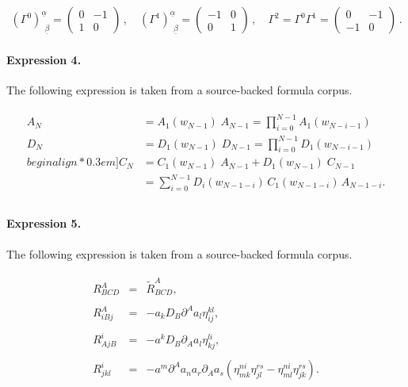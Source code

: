 \documentclass[11pt]{article}
\begin{document}
\begin{align*}(\Gamma^{0})^{\underline\alpha}_{~~\underline\beta}= \left(\begin{array}{cc}0 & -1\\1 & 0\end{array}\right)\,, \quad(\Gamma^{1})^{\underline\alpha}_{~~\underline\beta}= \left(\begin{array}{cc}-1 & 0\\0 & 1\end{array}\right)\, , \quad \Gamma^2=\Gamma^0\Gamma^1=\left(\begin{array}{cc}0 & -1\\-1 & 0\end{array}\right) \,.\end{align*}

\paragraph{Expression 4.} The following expression is taken from a source-backed formula corpus.

\begin{align*} \begin{aligned}A_N &= A_1(w_{N-1})\;\! A_{N-1} = \prod_{i=0}^{N-1} A_1(w_{N-i-1}) \\D_N &= D_1(w_{N-1})\;\! D_{N-1} = \prod_{i=0}^{N-1} D_1(w_{N-i-1}) \\begin{align*}0.3em]C_N &= C_1(w_{N-1})\;\! A_{N-1} + D_1(w_{N-1})\;\! C_{N-1} \\&= \sum_{i=0}^{N-1} D_i(w_{N-1-i})\, C_1(w_{N-1-i}) \, A_{N-1-i} . \\\end{aligned} \end{align*}

\paragraph{Expression 5.} The following expression is taken from a source-backed formula corpus.

\begin{align*}\begin{array}{ccc}R_{BCD}^A & = & \tilde{R}_{BCD}^A, \\ & & \\ R_{iBj}^A & = & -a_kD_B\partial ^Aa_l\eta _{ij}^{kl}, \\ & & \\ R_{AjB}^i & = & -a^kD_B\partial _Aa_l\eta _{kj}^{li}, \\ & & \\ R_{jkl}^i & = & -a^m\partial ^Aa_na_r\partial _Aa_s(\eta _{mk}^{ni}\eta_{jl}^{rs}-\eta _{ml}^{ni}\eta _{jk}^{rs}).\end{array}\end{align*}
\end{document}
